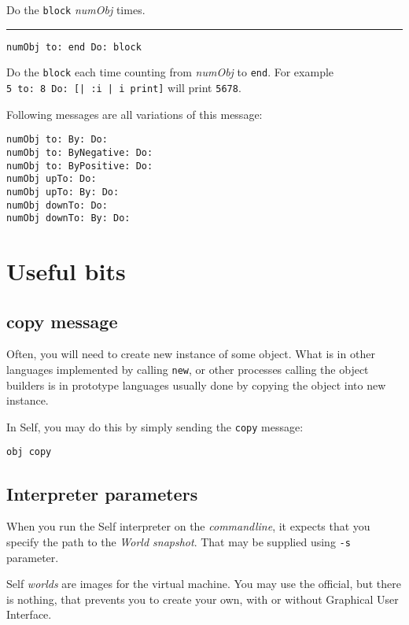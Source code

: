 \documentclass[10pt]{article}
\begin{document}
\begin{multicols*}{3}
Do the \texttt{block} \textit{numObj} times.

\vspace*{0.2cm}
\hrule

\begin{lstlisting}
numObj to: end Do: block
\end{lstlisting}

Do the \texttt{block} each time counting from \textit{numObj} to \texttt{end}. For example \texttt{5\ to:\ 8\ Do:\ [|\ :i\ |\ i\ print]} will print \texttt{5678}.

Following messages are all variations of this message:

\begin{lstlisting}
numObj to: By: Do:
numObj to: ByNegative: Do:
numObj to: ByPositive: Do:
numObj upTo: Do:
numObj upTo: By: Do:
numObj downTo: Do:
numObj downTo: By: Do:
\end{lstlisting}




\section{Useful bits}
\subsection{copy message}
Often, you will need to create new instance of some object. What is in other languages implemented by calling \texttt{new}, or other processes calling the object builders is in prototype languages usually done by copying the object into new instance.

In Self, you may do this by simply sending the \texttt{copy} message:

\begin{lstlisting}
obj copy
\end{lstlisting}



\subsection{Interpreter parameters}
When you run the Self interpreter on the \textit{commandline}, it expects that you specify the path to the \textit{World snapshot}. That may be supplied using \texttt{-s} parameter.

Self \textit{worlds} are images for the virtual machine. You may use the official, but there is nothing, that prevents you to create your own, with or without Graphical User Interface.




\end{multicols*}
\end{document}
